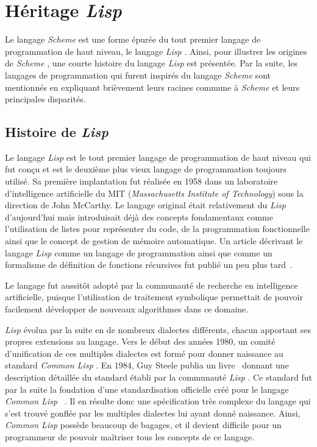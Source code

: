 \documentclass[12pt,twoside,letterpaper,francais]{book}
\newcommand{\lisp}{{\textit{Lisp }}}
\newcommand{\clisp}{{\textit{Common Lisp }}}
\newcommand{\Schemelang}{{\textit{Scheme }}}
\begin{document}
\FloatBarrier
\section{Héritage \lisp} \label{Scheme:hist}
Le langage \Schemelang est une forme épurée du tout premier langage de
programmation de haut niveau, le langage \lisp. Ainsi, pour illustrer
les origines de \Schemelang, une courte histoire du langage \lisp est
présentée. Par la suite, les langages de programmation qui furent
inspirés du langage \Schemelang sont mentionnés en expliquant brièvement
leurs racines commune à \Schemelang et leurs principales disparités.


\FloatBarrier
\subsection{Histoire de \lisp}
Le langage \lisp est le tout premier langage de programmation de haut
niveau qui fut conçu et est le deuxième plus vieux langage de
programmation toujours utilisé. Sa première implantation fut réalisée
en 1958 dans un laboratoire d'intelligence artificielle du MIT
(\textit{Massachusetts Institute of Technology}) sous la direction de
John McCarthy. Le langage original était relativement du \lisp
d'aujourd'hui mais introduisait déjà des concepts fondamentaux comme
l'utilisation de listes pour représenter du code, de la programmation
fonctionnelle ainsi que le concept de gestion de mémoire
automatique. Un article décrivant le langage \lisp comme un langage de
programmation ainsi que comme un formalisme de définition de fonctions
récursives fut publié un peu plus tard~\cite{LISP_ORIGINS}.

Le langage fut aussitôt adopté par la communauté de recherche en
intelligence artificielle, puisque l'utilisation de traitement
symbolique permettait de pouvoir facilement développer de nouveaux
algorithmes dans ce domaine.

\lisp évolua par la suite en de nombreux dialectes différents, chacun
apportant ses propres extensions au langage. Vers le début des années
1980, un comité d'unification de ces multiples dialectes est formé
pour donner naissance au standard \clisp. En 1984, Guy Steele publia
un livre~\cite{CLISP} donnant une description détaillée du standard
établi par la communauté \lisp. Ce standard fut par la suite la
fondation d'une standardisation officielle créé pour le langage
\clisp~\cite{ANSI_CLISP}. Il en résulte donc une spécification très
complexe du langage qui s'est trouvé gonflée par les multiples
dialectes lui ayant donné naissance. Ainsi, \clisp possède beaucoup de
bagages, et il devient difficile pour un programmeur de pouvoir
maîtriser tous les concepts de ce langage.
\end{document}
